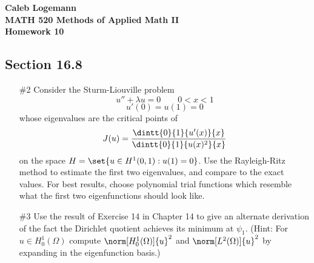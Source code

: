 \documentclass[11pt, oneside]{article}
\begin{document}
\noindent \textbf{\Large{Caleb Logemann \\
MATH 520 Methods of Applied Math II \\
Homework 10
}}

\subsection*{Section 16.8}
\begin{enumerate}
  \item[\#2]
    Consider the Sturm-Liouville problem
    \[
      u'' + \lambda u = 0 \qquad 0 < x < 1
    \]
    \[
      u'(0) = u(1) = 0
    \]
    whose eigenvalues are the critical points of
    \[
      J(u) = \frac{\dintt{0}{1}{u'(x)}{x}}{\dintt{0}{1}{u(x)^2}{x}}
    \]
    on the space $H = \set{u \in H^1(0, 1): u(1) = 0}$.
    Use the Rayleigh-Ritz method to estimate the first two eigenvalues, and
    compare to the exact values.
    For best results, choose polynomial trial functions which resemble what the
    first two eigenfunctions should look like.

  \item[\#3] %
    Use the result of Exercise 14 in Chapter 14 to give an alternate derivation
    of the fact the Dirichlet quotient achieves its minimum at $\psi_1$.
    (Hint: For $u \in H_0^1(\Omega)$ compute $\norm[H_0^1(\Omega)]{u}^2$ and
    $\norm[L^2(\Omega)]{u}^2$ by expanding in the eigenfunction basis.)


\end{enumerate}
\end{document}
